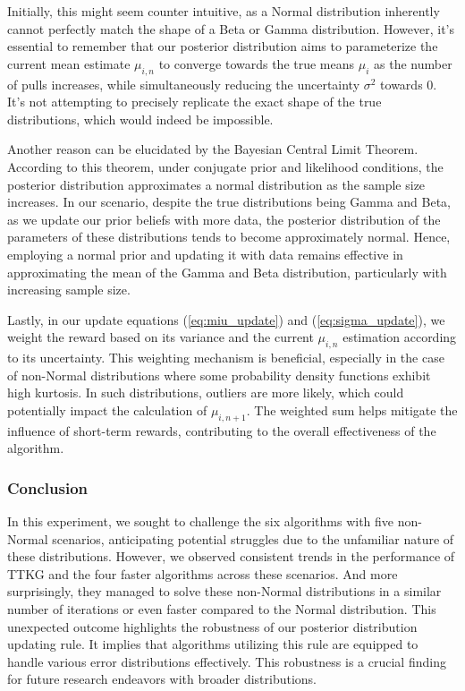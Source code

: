 \documentclass[a4paper, 12pt]{article}
\theoremstyle{definition}
\begin{document}
Initially, this might seem counter intuitive, as a Normal distribution inherently cannot perfectly match the shape of a Beta or Gamma distribution. However, it's essential to remember that our posterior distribution aims to parameterize the current mean estimate $\mu_{i,n}$ to converge towards the true means $\mu_i$ as the number of pulls increases, while simultaneously reducing the uncertainty $\sigma^2$ towards 0. It's not attempting to precisely replicate the exact shape of the true distributions, which would indeed be impossible.

Another reason can be elucidated by the Bayesian Central Limit Theorem. According to this theorem, under conjugate prior and likelihood conditions, the posterior distribution approximates a normal distribution as the sample size increases. In our scenario, despite the true distributions being Gamma and Beta, as we update our prior beliefs with more data, the posterior distribution of the parameters of these distributions tends to become approximately normal. Hence, employing a normal prior and updating it with data remains effective in approximating the mean of the Gamma and Beta distribution, particularly with increasing sample size.

Lastly, in our update equations (\ref{eq:miu_update}) and (\ref{eq:sigma_update}), we weight the reward based on its variance and the current $\mu_{i,n}$ estimation according to its uncertainty. This weighting mechanism is beneficial, especially in the case of non-Normal distributions where some probability density functions exhibit high kurtosis. In such distributions, outliers are more likely, which could potentially impact the calculation of $\mu_{i,n+1}$. The weighted sum helps mitigate the influence of short-term rewards, contributing to the overall effectiveness of the algorithm.

\subsubsection{Conclusion}
In this experiment, we sought to challenge the six algorithms with five non-Normal scenarios, anticipating potential struggles due to the unfamiliar nature of these distributions. However, we observed consistent trends in the performance of TTKG and the four faster algorithms across these scenarios. And more surprisingly, they managed to solve these non-Normal distributions in a similar number of iterations or even faster compared to the Normal distribution. This unexpected outcome highlights the robustness of our posterior distribution updating rule. It implies that algorithms utilizing this rule are equipped to handle various error distributions effectively. This robustness is a crucial finding for future research endeavors with broader distributions.
\end{document}
